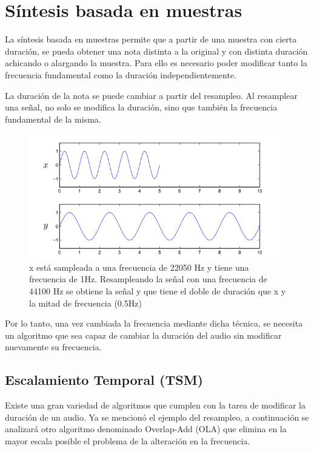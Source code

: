 \documentclass[assd_tp2_main.tex]{subfiles}
\begin{document}
\section{Síntesis basada en muestras}


La síntesis basada en muestras permite que a partir de una muestra con cierta duración, se pueda obtener una nota distinta a la original y con distinta duración achicando o alargando la muestra. Para ello es necesario poder modificar tanto la frecuencia fundamental como la duración independientemente.

La duración de la nota se puede cambiar a partir del resampleo. Al resamplear una señal, no solo se modifica la duración, sino que también la frecuencia fundamental de la misma.

\begin{figure}[H]	
	\centering
	\includegraphics[scale=1]{graficos/EJ6/timestretch.png}
	\caption{x está sampleada a una frecuencia de 22050 Hz y tiene una frecuencia de 1Hz. Resampleando la señal con una frecuencia de 44100 Hz se obtiene la señal y que tiene el doble de duración que x y la mitad de frecuencia (0.5Hz)}
\end{figure}

Por lo tanto, una vez cambiada la frecuencia mediante dicha técnica, se necesita un algoritmo que sea capaz de cambiar la duración del audio sin modificar nuevamente su frecuencia. 

\subsection{Escalamiento Temporal (TSM)}

Existe una gran variedad de algoritmos que cumplen con la tarea de modificar la duración de un audio. Ya se mencionó el ejemplo del resampleo, a continuación se analizará otro algoritmo denominado Overlap-Add (OLA) que elimina en la mayor escala posible el problema de la alteración en la frecuencia.
\end{document}
